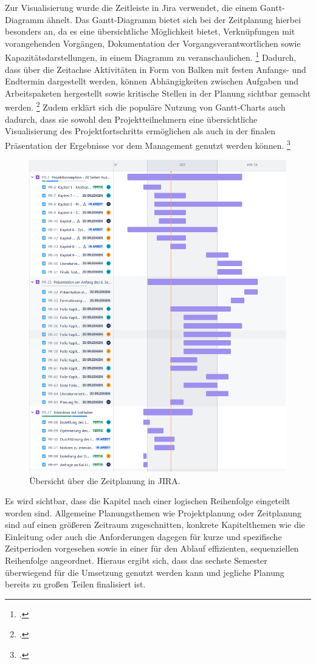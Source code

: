 Zur Visualisierung wurde die Zeitleiste in Jira verwendet, die einem Gantt-Diagramm ähnelt.
Das Gantt-Diagramm bietet sich bei der Zeitplanung hierbei besonders an, da es eine
übersichtliche Möglichkeit bietet, Verknüpfungen mit vorangehenden Vorgängen,
Dokumentation der Vorgangsverantwortlichen sowie Kapazitätsdarstellungen, in einem
Diagramm zu veranschaulichen.
\footcite[Vgl.][123]{osterhageAnhangProjektmanagement2016}
Dadurch, dass über die Zeitachse Aktivitäten in Form von Balken mit festen Anfangs-
und Endtermin dargestellt werden, können Abhängigkeiten zwischen Aufgaben und
Arbeitspaketen hergestellt sowie kritische Stellen in der Planung sichtbar gemacht
werden.
\footcite[Vgl.][117]{hobelGABLERBUSINESSWISSENAZ2006}
Zudem erklärt sich die populäre Nutzung von Gantt-Charts auch dadurch, dass
sie sowohl den Projektteilnehmern eine übersichtliche Visualisierung des Projektfortschritts
ermöglichen als auch in der finalen Präsentation der Ergebnisse vor dem Management genutzt
werden können.
\footcite[Vgl.][435]{wilsonGanttChartsCentenary2003}
\begin{figure}[H]
    \centering
    \includegraphics[width=0.9\linewidth]{graphics/zeitplanung.png}
    \caption{Übersicht über die Zeitplanung in JIRA.}\label{abb:zeitplanung}
\end{figure}
Es wird sichtbar, dass die Kapitel nach einer logischen Reihenfolge eingeteilt worden sind.
Allgemeine Planungsthemen wie Projektplanung oder
Zeitplanung sind auf einen größeren Zeitraum zugeschnitten, konkrete Kapitelthemen wie die
Einleitung oder auch die Anforderungen dagegen für kurze und spezifische Zeitperioden vorgesehen
sowie in einer für den Ablauf effizienten, sequenziellen Reihenfolge angeordnet. Hieraus ergibt
sich, dass das sechste Semester überwiegend für die Umsetzung genutzt werden kann und jegliche
Planung bereits zu großen Teilen finalisiert ist.

